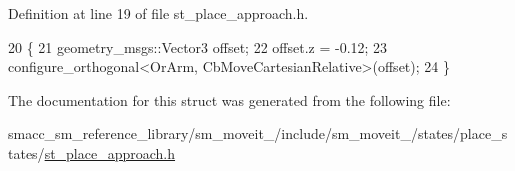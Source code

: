 Definition at line 19 of file st\+\_\+place\+\_\+approach.\+h.


\begin{DoxyCode}
20     \{
21         geometry\_msgs::Vector3 offset;
22         offset.z = -0.12;
23         configure\_orthogonal<OrArm, CbMoveCartesianRelative>(offset);
24     \}
\end{DoxyCode}


The documentation for this struct was generated from the following file\+:\begin{DoxyCompactItemize}
\item 
smacc\+\_\+sm\+\_\+reference\+\_\+library/sm\+\_\+moveit\+\_/include/sm\+\_\+moveit\+\_/states/place\+\_\+states/\hyperlink{3_2include_2sm__moveit__3_2states_2place__states_2st__place__approach_8h}{st\+\_\+place\+\_\+approach.\+h}\end{DoxyCompactItemize}
